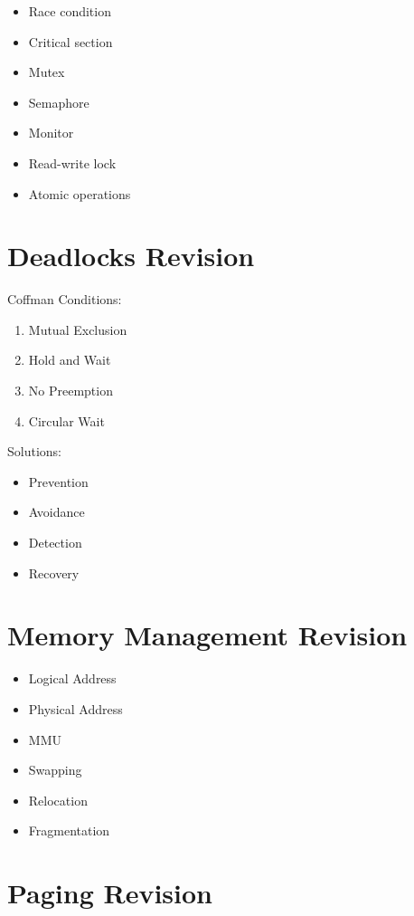 \begin{itemize}
\item Race condition
\item Critical section
\item Mutex
\item Semaphore
\item Monitor
\item Read-write lock
\item Atomic operations
\end{itemize}

\section{Deadlocks Revision}

Coffman Conditions:

\begin{enumerate}
\item Mutual Exclusion
\item Hold and Wait
\item No Preemption
\item Circular Wait
\end{enumerate}

Solutions:

\begin{itemize}
\item Prevention
\item Avoidance
\item Detection
\item Recovery
\end{itemize}

\section{Memory Management Revision}

\begin{itemize}
\item Logical Address
\item Physical Address
\item MMU
\item Swapping
\item Relocation
\item Fragmentation
\end{itemize}

\section{Paging Revision}

